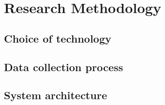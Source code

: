 \chapter{Research Methodology}

\section{Choice of technology}


\section{Data collection process}


\section{System architecture}



